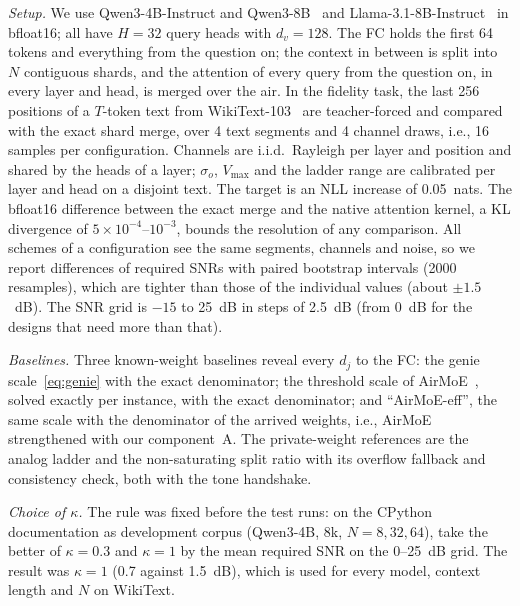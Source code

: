 \emph{Setup.} We use Qwen3-4B-Instruct and Qwen3-8B~\cite{qwen3} and Llama-3.1-8B-Instruct~\cite{llama3} in bfloat16; all have $H=32$ query heads with $d_v=128$. The FC holds the first 64 tokens and everything from the question on; the context in between is split into $N$ contiguous shards, and the attention of every query from the question on, in every layer and head, is merged over the air. In the fidelity task, the last 256 positions of a $T$-token text from WikiText-103~\cite{merity2017wikitext} are teacher-forced and compared with the exact shard merge, over 4 text segments and 4 channel draws, i.e., 16 samples per configuration. Channels are i.i.d.\ Rayleigh per layer and position and shared by the heads of a layer; $\sigma_o$, $V_{\max}$ and the ladder range are calibrated per layer and head on a disjoint text. The target is an NLL increase of 0.05~nats. The bfloat16 difference between the exact merge and the native attention kernel, a KL divergence of $5\times10^{-4}$--$10^{-3}$, bounds the resolution of any comparison. All schemes of a configuration see the same segments, channels and noise, so we report differences of required SNRs with paired bootstrap intervals (2000 resamples), which are tighter than those of the individual values (about $\pm1.5$~dB). The SNR grid is $-15$ to 25~dB in steps of 2.5~dB (from 0~dB for the designs that need more than that).

\emph{Baselines.} Three known-weight baselines reveal every $d_j$ to the FC: the genie scale~\eqref{eq:genie} with the exact denominator; the threshold scale of AirMoE~\cite{yang2026airmoe}, solved exactly per instance, with the exact denominator; and ``AirMoE-eff'', the same scale with the denominator of the arrived weights, i.e., AirMoE strengthened with our component~A. The private-weight references are the analog ladder and the non-saturating split ratio with its overflow fallback and consistency check, both with the tone handshake.

\emph{Choice of $\kappa$.} The rule was fixed before the test runs: on the CPython documentation as development corpus (Qwen3-4B, 8k, $N=8,32,64$), take the better of $\kappa=0.3$ and $\kappa=1$ by the mean required SNR on the 0--25~dB grid. The result was $\kappa=1$ (0.7 against 1.5~dB), which is used for every model, context length and $N$ on WikiText.

